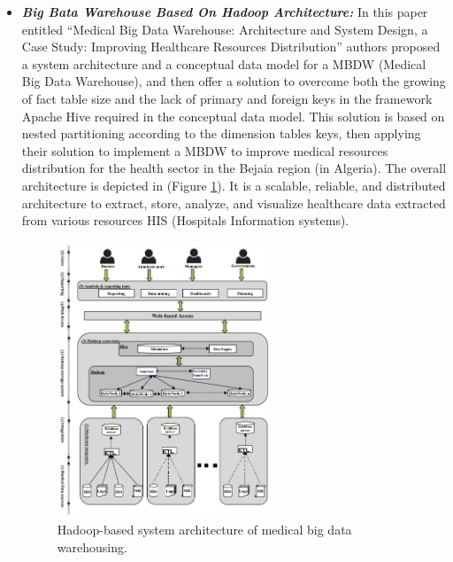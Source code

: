 \begin{itemize}
    \item \textbf{\textit{Big Bata Warehouse Based On Hadoop Architecture:}} In this paper\cite{sebaa2018medical} entitled “Medical Big Data Warehouse: Architecture and System Design, a Case Study: Improving Healthcare Resources Distribution” authors proposed a system architecture and a conceptual data model for a MBDW (Medical Big Data Warehouse), and then offer a solution to overcome both the growing of fact table size and the lack of primary and foreign keys in the framework Apache Hive required in the conceptual data model. This solution is based on nested partitioning according to the dimension tables keys, then  applying their solution to implement a MBDW to improve medical resources distribution for the health sector in the Bejaia region (in Algeria). 
    \bigbreak
    The overall architecture is depicted in (Figure \ref{fig:bigdatarelated}). It is a scalable, reliable, and distributed architecture to extract, store, analyze, and visualize healthcare data extracted from various resources HIS (Hospitals Information systems).
    \begin{figure}[h!]
      \center
      \includegraphics[width=0.60\textwidth]{images/chapter3/relatedwork/relatedworkHadoop.PNG}
      \caption{Hadoop-based system architecture of medical big data warehousing.}
      \label{fig:bigdatarelated}
    \end{figure}
\end{itemize}

\newpage
